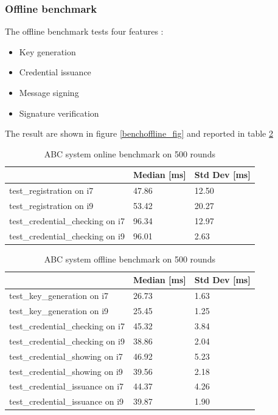 \documentclass[10pt,conference,compsocconf]{IEEEtran}
\begin{document}
\subsubsection{Offline benchmark}
The offline benchmark tests four features :
\begin{itemize}
    \item Key generation
    \item Credential issuance
    \item Message signing
    \item Signature verification
\end{itemize}
The result are shown in figure \ref{benchoffline_fig}
and reported in table \ref{benchoffline}

\begin{table}[]
\centering
\begin{tabular}{|l|l|l|}
\hline
                                 & Median [ms] & Std Dev [ms] \\ \hline
test\_registration on i7         & 47.86  & 12.50   \\ \hline
test\_registration on i9         & 53.42  & 20.27   \\ \hline
test\_credential\_checking on i7 & 96.34  & 12.97   \\ \hline
test\_credential\_checking on i9 & 96.01  & 2.63    \\ \hline
\end{tabular}
\caption{ABC system online benchmark on 500 rounds}
\label{benchonline}
\end{table}

\begin{table}[]
\centering
\begin{tabular}{|l|l|l|}
\hline
                                 & Median [ms] & Std Dev [ms] \\ \hline
test\_key\_generation on i7      & 26.73  & 1.63    \\ \hline
test\_key\_generation on i9      & 25.45  & 1.25    \\ \hline
test\_credential\_checking on i7 & 45.32  & 3.84    \\ \hline
test\_credential\_checking on i9 & 38.86  & 2.04    \\ \hline
test\_credential\_showing on i7  & 46.92  & 5.23    \\ \hline
test\_credential\_showing on i9  & 39.56  & 2.18    \\ \hline
test\_credential\_issuance on i7 & 44.37  & 4.26    \\ \hline
test\_credential\_issuance on i9 & 39.87  & 1.90    \\ \hline
\end{tabular}
\caption{ABC system offline benchmark on 500 rounds}
\label{benchoffline}
\end{table}
\end{document}
